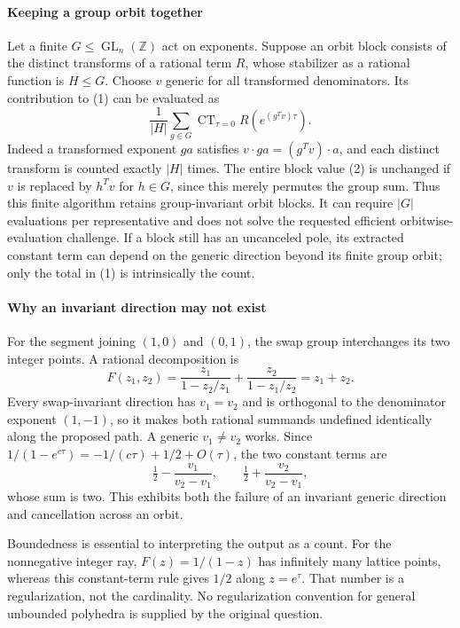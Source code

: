 \documentclass[11pt]{article}
\begin{document}
\paragraph{Keeping a group orbit together}
Let a finite $G\leq\operatorname{GL}_n(\mathbb Z)$ act on exponents. Suppose an orbit block consists of the distinct transforms of a rational term $R$, whose stabilizer as a rational function is $H\leq G$. Choose $v$ generic for all transformed denominators. Its contribution to (1) can be evaluated as
\[
 \frac1{|H|}\sum_{g\in G}\operatorname{CT}_{\tau=0}R(e^{(g^Tv)\tau}).
 \tag{2}
\]
Indeed a transformed exponent $ga$ satisfies $v\cdot ga=(g^Tv)\cdot a$, and each distinct transform is counted exactly $|H|$ times. The entire block value (2) is unchanged if $v$ is replaced by $h^Tv$ for $h\in G$, since this merely permutes the group sum. Thus this finite algorithm retains group-invariant orbit blocks. It can require $|G|$ evaluations per representative and does not solve the requested efficient orbitwise-evaluation challenge. If a block still has an uncanceled pole, its extracted constant term can depend on the generic direction beyond its finite group orbit; only the total in (1) is intrinsically the count.

\paragraph{Why an invariant direction may not exist}
For the segment joining $(1,0)$ and $(0,1)$, the swap group interchanges its two integer points. A rational decomposition is
\[
 F(z_1,z_2)=\frac{z_1}{1-z_2/z_1}+\frac{z_2}{1-z_1/z_2}=z_1+z_2.
\]
Every swap-invariant direction has $v_1=v_2$ and is orthogonal to the denominator exponent $(1,-1)$, so it makes both rational summands undefined identically along the proposed path. A generic $v_1\ne v_2$ works. Since
$1/(1-e^{c\tau})=-1/(c\tau)+1/2+O(\tau)$,
the two constant terms are
\[
 \tfrac12-\frac{v_1}{v_2-v_1},\qquad
 \tfrac12+\frac{v_2}{v_2-v_1},
\]
whose sum is two. This exhibits both the failure of an invariant generic direction and cancellation across an orbit.

Boundedness is essential to interpreting the output as a count. For the nonnegative integer ray, $F(z)=1/(1-z)$ has infinitely many lattice points, whereas this constant-term rule gives $1/2$ along $z=e^\tau$. That number is a regularization, not the cardinality. No regularization convention for general unbounded polyhedra is supplied by the original question.
\end{document}
